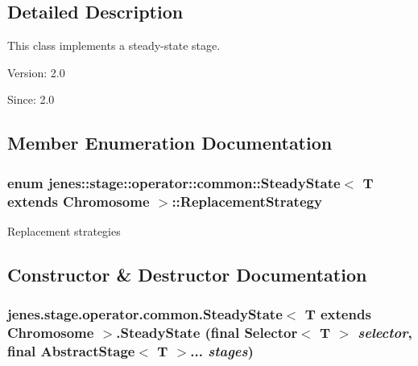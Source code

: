 \subsection{Detailed Description}
This class implements a steady-state stage.

\begin{Desc}
\item[Version:]2.0 \end{Desc}
\begin{Desc}
\item[Since:]2.0 \end{Desc}


\subsection{Member Enumeration Documentation}
\hypertarget{classjenes_1_1stage_1_1operator_1_1common_1_1_steady_state_3_01_t_01extends_01_chromosome_01_4_da95b83b7d620e80c70fbed3b8159de1}{
\subsubsection[ReplacementStrategy]{\setlength{\rightskip}{0pt plus 5cm}enum jenes::stage::operator::common::SteadyState$<$ T extends Chromosome $>$::{\bf ReplacementStrategy}}}
\label{classjenes_1_1stage_1_1operator_1_1common_1_1_steady_state_3_01_t_01extends_01_chromosome_01_4_da95b83b7d620e80c70fbed3b8159de1}


Replacement strategies 

\subsection{Constructor \& Destructor Documentation}
\hypertarget{classjenes_1_1stage_1_1operator_1_1common_1_1_steady_state_3_01_t_01extends_01_chromosome_01_4_f39cd5e467ed1a020779c89894c5f63e}{
\subsubsection[SteadyState]{\setlength{\rightskip}{0pt plus 5cm}jenes.stage.operator.common.SteadyState$<$ T extends Chromosome $>$.SteadyState (final Selector$<$ T $>$ {\em selector}, \/  final AbstractStage$<$ T $>$... {\em stages})}}
\label{classjenes_1_1stage_1_1operator_1_1common_1_1_steady_state_3_01_t_01extends_01_chromosome_01_4_f39cd5e467ed1a020779c89894c5f63e}


